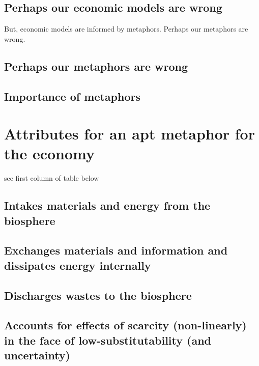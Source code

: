 \subsection{Perhaps our economic models are wrong}
\label{sec:wrong_models}

But, economic models are informed by metaphors. Perhaps our metaphors are wrong.

\subsection{Perhaps our metaphors are wrong}
\label{sec:wrong_metaphors}


\subsection{Importance of metaphors}
\label{sec:importance_metaphors}

\section{Attributes for an apt metaphor for the economy}
\label{sec:metaphor_requirements}

see first column of table below

\subsection{Intakes materials and energy from the biosphere}
\label{sec:inputs}

\subsection{Exchanges materials and information and dissipates energy internally}
\label{sec:internal_exchange}

\subsection{Discharges wastes to the biosphere}
\label{sec:discharges_waste}

\subsection{Accounts for effects of scarcity (non-linearly) in the face of low-substitutability (and uncertainty)}
\label{sec:accounts_for_scarcity}

